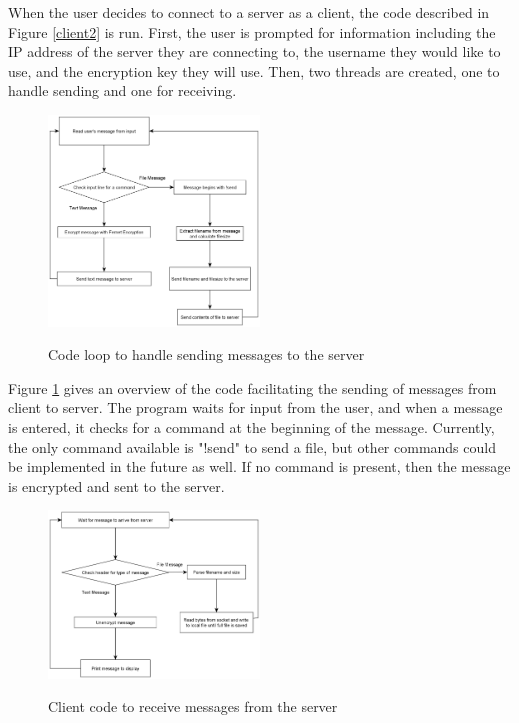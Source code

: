\documentclass{article}
\begin{document}
When the user decides to connect to a server as a client, the code described in Figure \ref{client2} is run. First, the user is prompted for information including the IP address of the server they are connecting to, the username they would like to use, and the encryption key they will use. Then, two threads are created, one to handle sending and one for receiving.

\begin{figure}[h]
\caption{Code loop to handle sending messages to the server}
\centering
\includegraphics[width=0.5\textwidth]{media/clientFlowchart1.png}
\label{client1}
\end{figure}

Figure \ref{client1} gives an overview of the code facilitating the sending of messages from client to server. The program waits for input from the user, and when a message is entered, it checks for a command at the beginning of the message. Currently, the only command available is "!send" to send a file, but other commands could be implemented in the future as well. If no command is present, then the message is encrypted and sent to the server.

\begin{figure}[h]
\caption{Client code to receive messages from the server}
\centering
\includegraphics[width=0.5\textwidth]{media/clientFlowchart3.png}
\label{client3}
\end{figure}
\end{document}
